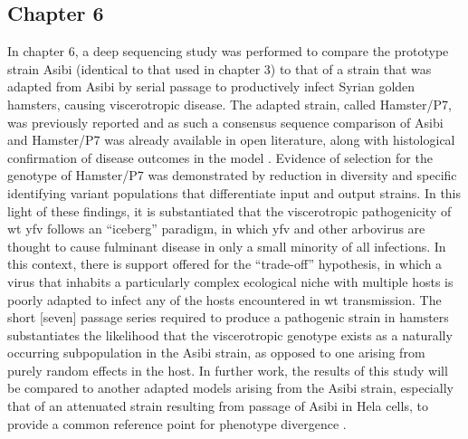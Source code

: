 \subsection{Chapter 6}
In chapter 6, a deep sequencing study was performed to compare the prototype strain Asibi (identical to that used in chapter 3) to that of a strain that was adapted from Asibi by serial passage to productively infect Syrian golden hamsters, causing viscerotropic disease. The adapted strain, called Hamster/P7, was previously reported and as such a consensus sequence comparison of Asibi and Hamster/P7 was already available in open literature, along with histological confirmation of disease outcomes in the model \parencite{McArthur:2003fv}. Evidence of selection for the genotype of Hamster/P7 was demonstrated by reduction in diversity and specific identifying variant populations that differentiate input and output strains. In this light of these findings, it is substantiated that the viscerotropic pathogenicity of \gls{wt} \gls{yfv} follows an “iceberg” paradigm, in which \gls{yfv} and other arbovirus are thought to cause fulminant disease in only a small minority of all infections. In this context, there is support offered for the “trade-off” hypothesis, in which a virus that inhabits a particularly complex ecological niche with multiple hosts is poorly adapted to infect any of the hosts encountered in \gls{wt} transmission. The short [seven] passage series required to produce a pathogenic strain in hamsters substantiates the likelihood that the viscerotropic genotype exists as a naturally occurring subpopulation in the Asibi strain, as opposed to one arising from purely random effects in the host. In further work, the results of this study will be compared to another adapted models arising from the Asibi strain, especially that of an attenuated strain resulting from passage of Asibi in Hela cells, to provide a common reference point for phenotype divergence \parencite{Dunster:1999ij}. 
